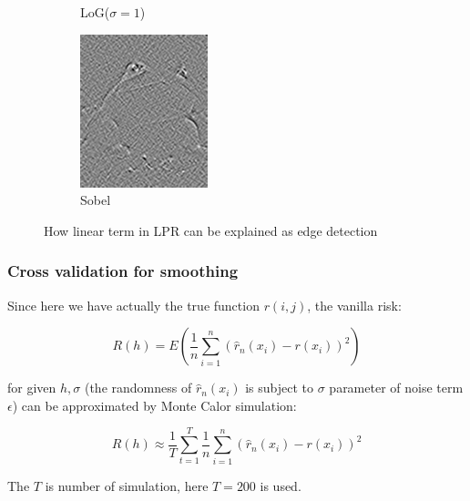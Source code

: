 \documentclass{beamer}
\begin{document}
\begin{frame}
\begin{figure}[htb]
\begin{subfigure}[b]{0.24\linewidth}
      \caption{LoG($\sigma=1$)}
    \end{subfigure}
    \begin{subfigure}[b]{0.24\linewidth}
      \includegraphics[width=\linewidth]{images/edge_4.png}
      \caption{Sobel}
    \end{subfigure}
    \caption{How linear term in LPR can be explained as edge detection}
    \label{fig:edge}
  \end{figure}
\end{frame}


\begin{frame}
  \frametitle{Cross validation for smoothing}

  Since here we have actually the true function $r(i,j)$, the vanilla risk:

  $$
  R(h) = E \left( \frac{1}{n}\sum_{i=1}^n(\hat{r}_n(x_i)-r(x_i))^2 \right)
  $$
  
  for given $h,\sigma$ (the randomness of $\hat{r}_n(x_i)$ is subject to $\sigma$ parameter of noise term $\epsilon$) 
  can be approximated by Monte Calor simulation:
  
  $$
  R(h) \approx \frac{1}{T} \sum_{t=1}^T \frac{1}{n}\sum_{i=1}^n(\hat{r}_n(x_i)-r(x_i))^2
  $$
  
  The $T$ is number of simulation, here $T=200$ is used.

\end{frame}
\end{document}
